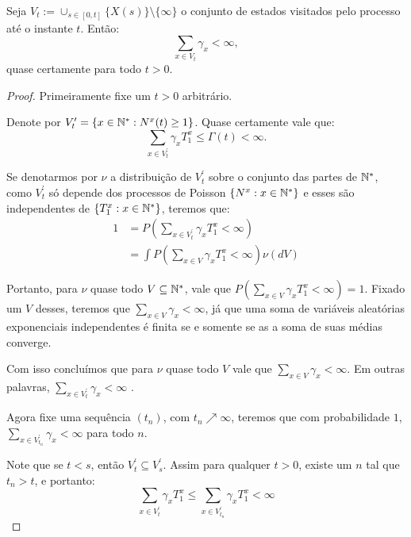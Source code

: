 \begin{proposicao}
  \label{prop:gamma-somavel}
  Seja $V_t := \cup_{s \in [0, t]} \{ X(s) \} \setminus \{\infty\}$ o
  conjunto de estados visitados pelo processo até o instante
  $t$. Então:
  \begin{displaymath}
    \sum_{x \in V_t} \gamma_x < \infty,
  \end{displaymath}
  quase certamente para todo $t > 0$.
\end{proposicao}
\begin{proof}

  Primeiramente fixe um $t > 0$ arbitrário.

  Denote por $V^\prime_t = \{ x \in {\mathbb{N^*}}: N^x(t) \geq 1 \}$. Quase
  certamente vale que:
  \begin{displaymath}
    \sum_{x \in V^\prime_t} \gamma_x T^x_1 \leq \Gamma(t) < \infty.
  \end{displaymath}

  Se denotarmos por $\nu$ a distribuição de $V^\prime_t$ sobre o conjunto
  das partes de ${\mathbb{N^*}}$, como $V^\prime_t$ só depende dos processos de
  Poisson $\{N^x: x \in {\mathbb{N^*}}\}$ e esses são independentes de $\{ T^x_1:
  x \in {\mathbb{N^*}} \}$, teremos que:
  \begin{align*}
    1 &= P\left(\sum_{x \in V^\prime_t} \gamma_x T^x_1 < \infty
    \right)\\
    &=\int P\left(\sum_{x \in V} \gamma_x T^x_1 < \infty
    \right) \nu(dV)
  \end{align*}

  Portanto, para $\nu$ quase todo $V \subseteq {\mathbb{N^*}}$, vale que
  $P(\sum_{x \in V} \gamma_x T^x_1 < \infty) = 1$. Fixado um
  $V$ desses, teremos que $\sum_{x \in V}\gamma_x < \infty$, já que
  uma soma de variáveis aleatórias exponenciais independentes é finita
  \qc se e somente se as a soma de suas médias converge.

  Com isso concluímos que para $\nu$ quase todo $V$ vale que $\sum_{x
    \in V}\gamma_x < \infty$. Em outras palavras, $\sum_{x \in
    V^\prime_t}\gamma_x < \infty$ \qc.

  Agora fixe uma sequência $(t_n)$, com $t_n\nearrow \infty$, teremos
  que com probabilidade $1$, $\sum_{x \in V^\prime_{t_n}}\gamma_x <
  \infty$ para todo $n$.

  Note que se $t < s$, então $V^\prime_t \subseteq V^\prime_s$. Assim
  para qualquer $t > 0$, existe um $n$ tal que $t_n > t$, e portanto:
  \begin{displaymath}
    \sum_{x \in V^\prime_t}\gamma_x T^x_1 \leq
    \sum_{x \in V^\prime_{t_n}}\gamma_x T^x_1 < \infty
  \end{displaymath}


\end{proof}
